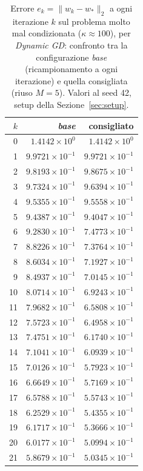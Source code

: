 \begin{table}[H]
\centering
\footnotesize
\renewcommand{\arraystretch}{0.85}
\setlength{\tabcolsep}{8pt}
\caption{Errore $e_k=\|w_k-w_*\|_2$ a ogni iterazione $k$ sul problema molto mal condizionata ($\kappa\approx 100$), per \emph{Dynamic GD}: confronto tra la configurazione \emph{base} (ricampionamento a ogni iterazione) e quella consigliata (riuso $M{=}5$). Valori al seed 42, setup della Sezione~\ref{sec:setup}.}
\label{tab:riuso_cons_veryill_gd}
\begin{tabular}{@{}rrr@{}}
\toprule
$k$ & \emph{base} & consigliato\\
\midrule
0 & $1.4142\times10^{0}$ & $1.4142\times10^{0}$\\
1 & $9.9721\times10^{-1}$ & $9.9721\times10^{-1}$\\
2 & $9.8193\times10^{-1}$ & $9.8675\times10^{-1}$\\
3 & $9.7324\times10^{-1}$ & $9.6394\times10^{-1}$\\
4 & $9.5355\times10^{-1}$ & $9.5558\times10^{-1}$\\
5 & $9.4387\times10^{-1}$ & $9.4047\times10^{-1}$\\
6 & $9.2830\times10^{-1}$ & $7.4773\times10^{-1}$\\
7 & $8.8226\times10^{-1}$ & $7.3764\times10^{-1}$\\
8 & $8.6034\times10^{-1}$ & $7.1927\times10^{-1}$\\
9 & $8.4937\times10^{-1}$ & $7.0145\times10^{-1}$\\
10 & $8.0714\times10^{-1}$ & $6.9243\times10^{-1}$\\
11 & $7.9682\times10^{-1}$ & $6.5808\times10^{-1}$\\
12 & $7.5723\times10^{-1}$ & $6.4958\times10^{-1}$\\
13 & $7.4751\times10^{-1}$ & $6.1740\times10^{-1}$\\
14 & $7.1041\times10^{-1}$ & $6.0939\times10^{-1}$\\
15 & $7.0126\times10^{-1}$ & $5.7923\times10^{-1}$\\
16 & $6.6649\times10^{-1}$ & $5.7169\times10^{-1}$\\
17 & $6.5788\times10^{-1}$ & $5.5743\times10^{-1}$\\
18 & $6.2529\times10^{-1}$ & $5.4355\times10^{-1}$\\
19 & $6.1717\times10^{-1}$ & $5.3666\times10^{-1}$\\
20 & $6.0177\times10^{-1}$ & $5.0994\times10^{-1}$\\
21 & $5.8679\times10^{-1}$ & $5.0345\times10^{-1}$\\

\end{tabular}
\end{table}
